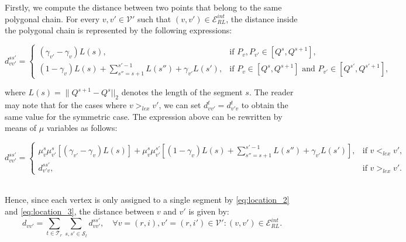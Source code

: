 \documentclass[12pt]{elsarticle}
\begin{document}
Firstly, we compute the distance between two points that belong to the same polygonal chain. For every $v, v'\in\mathcal V'$ such that $(v,v')\in\mathcal E_{RL}^{int}$, the distance inside the polygonal chain is represented by the following expressions:
\begin{scriptsize}
    
\begin{equation*}
 d_{vv'}^{ss'}= \left \{\begin{array}{lr}
 (\gamma_{v'}-\gamma_v) L(s),   & \mbox{if } P_v, P_{v'}\in [Q^s,Q^{s+1}], \\
(1-\gamma_v) L(s)+\displaystyle\sum_{s''=s+1}^{s'-1} L(s'')+\gamma_{v'} L(s'),  & \mbox{if } P_v\in[Q^s,Q^{s+1}]\mbox{ and } P_{v'} \in [Q^{s'}, Q^{s'+1}], 
 \end{array} \right.
\end{equation*}
\end{scriptsize}

where $L(s)=\|Q^{s+1}-Q^s||_2$ denotes the length of the segment $s$. The reader may note that for the cases where $v>_{lex} v'$, we can set $d_{vv'}^{t}=d_{v'v}^{t}$ to obtain the same value for the symmetric case. 
The expression above can be rewritten by means of $\mu$ variables as follows:
\begin{scriptsize}
    
\begin{equation*}\label{eq:distance_1}\tag{$Dist-C_1$}
    d_{vv'}^{ss'}=\left \{\begin{array}{lr} \mu_v^s\mu_{v'}^{s}\left[(\gamma_{v'}-\gamma_v)L(s)\right]+\mu_v^s\mu_{v'}^{s'}\left[(1-\gamma_v) L(s)+\displaystyle\sum_{s''=s+1}^{s'-1} L(s'')+\gamma_{v'} L(s')\right],& \mbox{if } v <_{lex} v',\\
    d_{v'v}^{ss'}, & \mbox{if } v >_{lex} v'.\end{array}\right. 
\end{equation*}
\end{scriptsize}
\\
Hence, since each vertex is only assigned to a single segment by \eqref{eq:location_2} and \eqref{eq:location_3}, the distance between $v$ and $v'$ is given by:
\begin{equation*}\label{eq:distance_2}\tag{$Dist-C_2$}    
d_{vv'}=\sum_{t\in\mathcal T_r}\sum_{s,s'\in\mathcal S_t}d_{vv'}^{ss'},\quad \forall v=(r,i), v'=(r,i')\in\mathcal V': (v,v')\in\mathcal E_{RL}^{int}.
\end{equation*}
\end{document}
